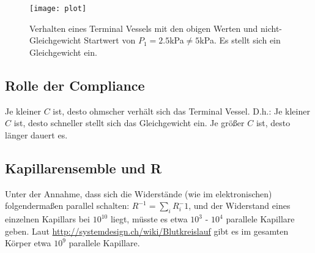 \documentclass[a4paper,12pt]{scrartcl}
\begin{document}
\begin{figure}[!htb]
  \centering
  \texttt{[image: plot]}
  \caption{Verhalten eines Terminal Vessels mit den obigen Werten und nicht-Gleichgewicht Startwert von $P_1 = 2.5$kPa$\neq 5$kPa. Es stellt sich ein Gleichgewicht ein.}
  \label{}
\end{figure}

\subsection*{Rolle der Compliance}
Je kleiner $C$ ist, desto ohmscher verhält sich das Terminal Vessel. D.h.: Je kleiner $C$ ist, desto schneller stellt sich das Gleichgewicht ein. Je größer $C$ ist, desto länger dauert es.


\subsection*{Kapillarensemble und R}
Unter der Annahme, dass sich die Widerstände (wie im elektronischen) folgendermaßen parallel schalten: $R^{-1} = \sum_i R_i^-1$, und der Widerstand eines einzelnen Kapillars bei $10^{10}$ liegt, müsste es etwa $10^3$ - $10^4$ parallele Kapillare geben. Laut \url{http://systemdesign.ch/wiki/Blutkreislauf} gibt es im gesamten Körper etwa $10^9$ parallele Kapillare.
\end{document}
